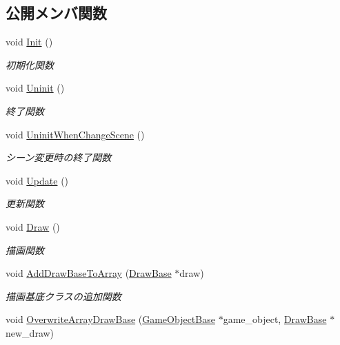 \subsection*{公開メンバ関数}
\begin{DoxyCompactItemize}
\item 
void \mbox{\hyperlink{class_draw_manager_a3cb9319d492285bd9dfc983d27e5d04f}{Init}} ()
\begin{DoxyCompactList}\small\item\em 初期化関数 \end{DoxyCompactList}\item 
void \mbox{\hyperlink{class_draw_manager_ae58095d9d734f30211011e9205aa57aa}{Uninit}} ()
\begin{DoxyCompactList}\small\item\em 終了関数 \end{DoxyCompactList}\item 
void \mbox{\hyperlink{class_draw_manager_a8b4ea38d625efbcc08d9b168cb5465f9}{Uninit\+When\+Change\+Scene}} ()
\begin{DoxyCompactList}\small\item\em シーン変更時の終了関数 \end{DoxyCompactList}\item 
void \mbox{\hyperlink{class_draw_manager_af498c44ff698bf3ef473df970e24c917}{Update}} ()
\begin{DoxyCompactList}\small\item\em 更新関数 \end{DoxyCompactList}\item 
void \mbox{\hyperlink{class_draw_manager_a43372495e68d77a2698f211cf921b37e}{Draw}} ()
\begin{DoxyCompactList}\small\item\em 描画関数 \end{DoxyCompactList}\item 
void \mbox{\hyperlink{class_draw_manager_a9dbd645fdbf927cd43d400335ff9b286}{Add\+Draw\+Base\+To\+Array}} (\mbox{\hyperlink{class_draw_base}{Draw\+Base}} $\ast$draw)
\begin{DoxyCompactList}\small\item\em 描画基底クラスの追加関数 \end{DoxyCompactList}\item 
void \mbox{\hyperlink{class_draw_manager_a94ef5a241c8d78187a2a6c0ed3c9efec}{Overwrite\+Array\+Draw\+Base}} (\mbox{\hyperlink{class_game_object_base}{Game\+Object\+Base}} $\ast$game\+\_\+object, \mbox{\hyperlink{class_draw_base}{Draw\+Base}} $\ast$new\+\_\+draw)

\end{DoxyCompactItemize}

